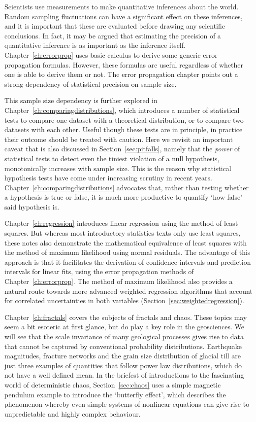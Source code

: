 Scientists use measurements to make quantitative inferences about the
world.  Random sampling fluctuations can have a significant effect on
these inferences, and it is important that these are evaluated before
drawing any scientific conclusions. In fact, it may be argued that
estimating the precision of a quantitative inference is as important
as the inference itself.  Chapter~\ref{ch:errorprop} uses basic
calculus to derive some generic error propagation formulas.  However,
these formulas are useful regardless of whether one is able to derive
them or not.  The error propagation chapter points out a strong
dependency of statistical precision on sample size.\medskip

This sample size dependency is further explored in
Chapter~\ref{ch:comparingdistributions}, which introduces a number of
statistical tests to compare one dataset with a theoretical
distribution, or to compare two datasets with each other. Useful
though these tests are in principle, in practice their outcome should
be treated with caution. Here we revisit an important caveat that is
also discussed in Section~\ref{sec:pitfalls}, namely that the
\emph{power} of statistical tests to detect even the tiniest violation
of a null hypothesis, monotonically increases with sample size. This
is the reason why statistical hypothesis tests have come under
increasing scrutiny in recent years.
Chapter~\ref{ch:comparingdistributions} advocates that, rather than
testing whether a hypothesis is true or false, it is much more
productive to quantify `how false' said hypothesis is.\medskip

Chapter~\ref{ch:regression} introduces linear regression using the
method of least squares. But whereas most introductory statistics
texts only use least squares, these notes also demonstrate the
mathematical equivalence of least squares with the method of maximum
likelihood using normal residuals. The advantage of this approach is
that it facilitates the derivation of confidence intervals and
prediction intervals for linear fits, using the error propagation
methods of Chapter~\ref{ch:errorprop}. The method of maximum
likelihood also provides a natural route towards more advanced
weighted regression algorithms that account for correlated
uncertainties in both variables
(Section~\ref{sec:weightedregression}).\medskip

Chapter~\ref{ch:fractals} covers the subjects of fractals and
chaos. These topics may seem a bit esoteric at first glance, but do
play a key role in the geosciences. We will see that the scale
invariance of many geological processes gives rise to data that cannot
be captured by conventional probability distributions. Earthquake
magnitudes, fracture networks and the grain size distribution of
glacial till are just three examples of quantities that follow power
law distributions, which do not have a well defined mean. In the
briefest of introductions to the fascinating world of deterministic
chaos, Section~\ref{sec:chaos} uses a simple magnetic pendulum example
to introduce the `butterfly effect', which describes the phenomenon
whereby even simple systems of nonlinear equations can give rise to
unpredictable and highly complex behaviour.\medskip

